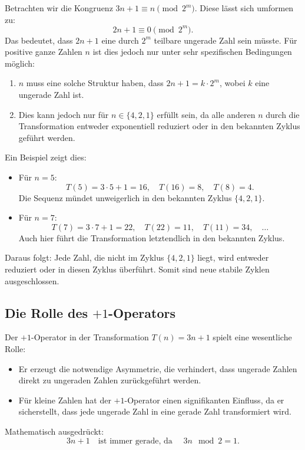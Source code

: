 \documentclass[a4paper,12pt]{article}
\begin{document}
Betrachten wir die Kongruenz \( 3n + 1 \equiv n \pmod{2^m} \). Diese lässt sich umformen zu:
\[
2n + 1 \equiv 0 \pmod{2^m}.
\]
Das bedeutet, dass \( 2n + 1 \) eine durch \( 2^m \) teilbare ungerade Zahl sein müsste. Für positive ganze Zahlen \( n \) ist dies jedoch nur unter sehr spezifischen Bedingungen möglich:
\begin{enumerate}
    \item \( n \) muss eine solche Struktur haben, dass \( 2n + 1 = k \cdot 2^m \), wobei \( k \) eine ungerade Zahl ist.
    \item Dies kann jedoch nur für \( n \in \{4, 2, 1\} \) erfüllt sein, da alle anderen \( n \) durch die Transformation entweder exponentiell reduziert oder in den bekannten Zyklus geführt werden.
\end{enumerate}

Ein Beispiel zeigt dies:
\begin{itemize}
    \item Für \( n = 5 \): 
    \[
    T(5) = 3 \cdot 5 + 1 = 16, \quad T(16) = 8, \quad T(8) = 4.
    \]
    Die Sequenz mündet unweigerlich in den bekannten Zyklus \( \{4, 2, 1\} \).
    \item Für \( n = 7 \): 
    \[
    T(7) = 3 \cdot 7 + 1 = 22, \quad T(22) = 11, \quad T(11) = 34, \quad \dots
    \]
    Auch hier führt die Transformation letztendlich in den bekannten Zyklus.
\end{itemize}

Daraus folgt: Jede Zahl, die nicht im Zyklus \( \{4, 2, 1\} \) liegt, wird entweder reduziert oder in diesen Zyklus überführt. Somit sind neue stabile Zyklen ausgeschlossen.

\subsection{Die Rolle des \(+1\)-Operators}
Der \(+1\)-Operator in der Transformation \( T(n) = 3n + 1 \) spielt eine wesentliche Rolle:
\begin{itemize}
    \item Er erzeugt die notwendige Asymmetrie, die verhindert, dass ungerade Zahlen direkt zu ungeraden Zahlen zurückgeführt werden.
    \item Für kleine Zahlen hat der \(+1\)-Operator einen signifikanten Einfluss, da er sicherstellt, dass jede ungerade Zahl in eine gerade Zahl transformiert wird.
\end{itemize}

Mathematisch ausgedrückt:
\[
3n + 1 \quad \text{ist immer gerade, da } \quad 3n \mod 2 = 1.
\]
\end{document}

